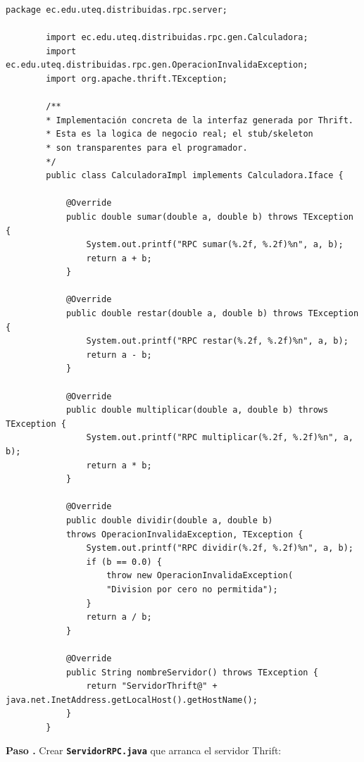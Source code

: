 \documentclass[12pt, a4paper, openany]{book}
\newcounter{paso}[section]
\newcommand{\paso}[1]{%
	\stepcounter{paso}%
	\medskip\noindent
	\begin{tcolorbox}[enhanced, colback=white, colframe=practiceBlue,
		boxrule=0.8pt, arc=3pt, left=6pt, right=6pt, top=4pt, bottom=4pt,
		before upper={\noindent}]
		\textcolor{practiceBlue}{\textbf{Paso \arabic{paso}.}} #1
	\end{tcolorbox}%
}
\newcommand{\archivo}[1]{\texttt{\textbf{#1}}}
\begin{document}
	\begin{lstlisting}[style=JavaStyle, caption={CalculadoraImpl.java --- Implementación de la lógica RPC}]
		package ec.edu.uteq.distribuidas.rpc.server;
		
		import ec.edu.uteq.distribuidas.rpc.gen.Calculadora;
		import ec.edu.uteq.distribuidas.rpc.gen.OperacionInvalidaException;
		import org.apache.thrift.TException;
		
		/**
		* Implementación concreta de la interfaz generada por Thrift.
		* Esta es la logica de negocio real; el stub/skeleton
		* son transparentes para el programador.
		*/
		public class CalculadoraImpl implements Calculadora.Iface {
			
			@Override
			public double sumar(double a, double b) throws TException {
				System.out.printf("RPC sumar(%.2f, %.2f)%n", a, b);
				return a + b;
			}
			
			@Override
			public double restar(double a, double b) throws TException {
				System.out.printf("RPC restar(%.2f, %.2f)%n", a, b);
				return a - b;
			}
			
			@Override
			public double multiplicar(double a, double b) throws TException {
				System.out.printf("RPC multiplicar(%.2f, %.2f)%n", a, b);
				return a * b;
			}
			
			@Override
			public double dividir(double a, double b)
			throws OperacionInvalidaException, TException {
				System.out.printf("RPC dividir(%.2f, %.2f)%n", a, b);
				if (b == 0.0) {
					throw new OperacionInvalidaException(
					"Division por cero no permitida");
				}
				return a / b;
			}
			
			@Override
			public String nombreServidor() throws TException {
				return "ServidorThrift@" + java.net.InetAddress.getLocalHost().getHostName();
			}
		}
	\end{lstlisting}
	
	\paso{Crear \archivo{ServidorRPC.java} que arranca el servidor Thrift:}
	
\end{document}
